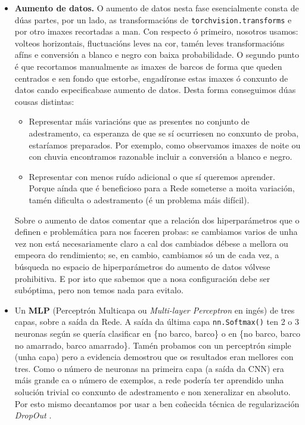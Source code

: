 \documentclass{article}
\begin{document}
\begin{itemize}
	\item \textbf{Aumento de datos.} O aumento de datos nesta fase esencialmente consta de dúas partes, por un lado, as transformacións de \texttt{torchvision.transforms} e por otro imaxes recortadas a man. Con respecto ó  primeiro, nosotros usamos: volteos horizontais, fluctuacións leves na cor, tamén leves transformacións afíns e conversión a blanco e negro con baixa probabilidade. O segundo punto é que recortamos manualmente as imaxes de barcos de forma que queden centrados e sen fondo que estorbe, engadíronse estas imaxes ó conxunto de datos cando especificabase aumento de datos. Desta forma conseguimos dúas cousas distintas: 
	\begin{itemize}
		\item Representar máis variacións que as presentes no conjunto de adestramento, ca esperanza de que se sí ocurriesen no conxunto de proba, estaríamos preparados. Por exemplo, como observamos imaxes de noite ou con chuvia encontramos razonable incluir a conversión a blanco e negro.
		\item Representar con menos ruído adicional o que sí queremos aprender. Porque aínda que é beneficioso para a Rede someterse a moita variación, tamén dificulta o adestramento (é un problema máis difícil).
\end{itemize}

Sobre o aumento de datos comentar que a relación dos hiperparámetros que o definen e problemática para nos faceren probas: se cambiamos varios de unha vez non está necesariamente claro a cal dos cambiados débese a mellora ou empeora do rendimiento; se, en cambio, cambiamos só un de cada vez, a búsqueda no espacio de hiperparámetros do aumento de datos vólvese prohibitiva. E por isto que sabemos que a nosa configuración debe ser subóptima, pero non temos nada para evitalo.
\item Un \textbf{MLP} (Perceptrón Multicapa ou \emph{Multi-layer Perceptron} en ingés) de tres capas, sobre a saída da Rede. A saída da última capa \texttt{nn.Softmax()} ten 2 o 3 neuronas según se quería clasificar en \{no barco, barco\} o en \{no barco, barco no amarrado, barco amarrado\}. Tamén probamos con un perceptrón simple (unha capa) pero a evidencia demostrou que os resultados eran mellores con tres. Como o número de neuronas na primeira capa (a saída da CNN) era máis grande ca o número de exemplos, a rede podería ter aprendido unha solución trivial co conxunto de adestramento e non xeneralizar en absoluto. Por esto mismo decantamos por usar a ben coñecida técnica de regularización \emph{DropOut} \cite{srivastava2014dropout}. 
\end{itemize}
\end{document}
